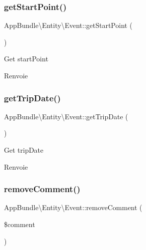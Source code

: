 \subsubsection{\texorpdfstring{get\+Start\+Point()}{getStartPoint()}}
{\footnotesize\ttfamily App\+Bundle\textbackslash{}\+Entity\textbackslash{}\+Event\+::get\+Start\+Point (\begin{DoxyParamCaption}{ }\end{DoxyParamCaption})}

Get start\+Point

\begin{DoxyReturn}{Renvoie}

\end{DoxyReturn}
\mbox{\label{classAppBundle_1_1Entity_1_1Event_af2da1b9ca4e516fb74fa249a81400df7}} 
\subsubsection{\texorpdfstring{get\+Trip\+Date()}{getTripDate()}}
{\footnotesize\ttfamily App\+Bundle\textbackslash{}\+Entity\textbackslash{}\+Event\+::get\+Trip\+Date (\begin{DoxyParamCaption}{ }\end{DoxyParamCaption})}

Get trip\+Date

\begin{DoxyReturn}{Renvoie}

\end{DoxyReturn}
\mbox{\label{classAppBundle_1_1Entity_1_1Event_ae18b32a77fca5c2ec3f7e71aedb8296f}} 
\subsubsection{\texorpdfstring{remove\+Comment()}{removeComment()}}
{\footnotesize\ttfamily App\+Bundle\textbackslash{}\+Entity\textbackslash{}\+Event\+::remove\+Comment (\begin{DoxyParamCaption}\item[{\textbackslash{}\hyperlink{classAppBundle_1_1Entity_1_1EventComment}{App\+Bundle\textbackslash{}\+Entity\textbackslash{}\+Event\+Comment}}]{\$comment }\end{DoxyParamCaption})}

